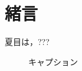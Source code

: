 \section{緒言}
夏目\cite{Soseki1905}は，???
\begin{figure}[t]%
\begin{center}
\caption{キャプション}
\label{sukima}
\end{center}
\end{figure}
